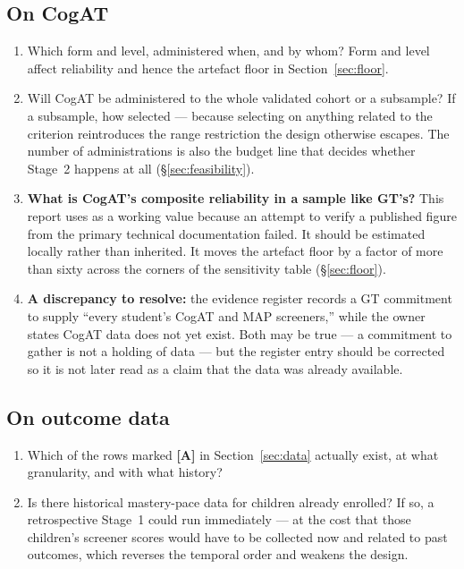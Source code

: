 \documentclass[11pt,a4paper]{article}
\begin{document}
\subsection*{On CogAT}
\begin{enumerate}[leftmargin=1.6em,itemsep=0.15em,start=9]
\item Which form and level, administered when, and by whom? Form and level
affect reliability and hence the artefact floor in Section~\ref{sec:floor}.
\item Will CogAT be administered to the whole validated cohort or a subsample?
If a subsample, how selected --- because selecting on anything related to the
criterion reintroduces the range restriction the design otherwise escapes. The
number of administrations is also the budget line that decides whether Stage~2
happens at all (\S\ref{sec:feasibility}).
\item \textbf{What is CogAT's composite reliability in a sample like GT's?} This
report uses \RelComparator{} as a working value because an attempt to verify a
published figure from the primary technical documentation failed. It should be
estimated locally rather than inherited. It moves the artefact floor by a factor
of more than sixty across the corners of the sensitivity table
(\S\ref{sec:floor}).
\item \textbf{A discrepancy to resolve:} the evidence register records a GT
commitment to supply ``every student's CogAT and MAP screeners,'' while the
owner states CogAT data does not yet exist. Both may be true --- a commitment to
gather is not a holding of data --- but the register entry should be corrected
so it is not later read as a claim that the data was already available.
\end{enumerate}

\subsection*{On outcome data}
\begin{enumerate}[leftmargin=1.6em,itemsep=0.15em,start=13]
\item Which of the rows marked \textbf{[A]} in Section~\ref{sec:data} actually
exist, at what granularity, and with what history?
\item Is there historical mastery-pace data for children already enrolled? If
so, a retrospective Stage~1 could run immediately --- at the cost that those
children's screener scores would have to be collected now and related to past
outcomes, which reverses the temporal order and weakens the design.
\end{enumerate}
\end{document}
